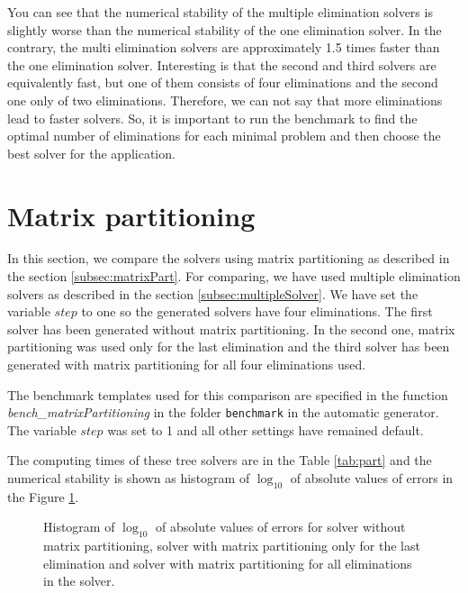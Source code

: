 You can see that the numerical stability of the multiple elimination solvers is slightly worse than the numerical stability of the one elimination solver. In the contrary, the multi elimination solvers are approximately 1.5 times faster than the one elimination solver. Interesting is that the second and third solvers are equivalently fast, but one of them consists of four eliminations and the second one only of two eliminations. Therefore, we can not say that more eliminations lead to faster solvers. So, it is important to run the benchmark to find the optimal number of eliminations for each minimal problem and then choose the best solver for the application.

\section{Matrix partitioning}
\label{exp:part}
In this section, we compare the solvers using matrix partitioning as described in the section \ref{subsec:matrixPart}. For comparing, we have used multiple elimination solvers as described in the section \ref{subsec:multipleSolver}. We have set the variable $step$ to one so the generated solvers have four eliminations. The first solver has been generated without matrix partitioning. In the second one, matrix partitioning was used only for the last elimination and the third solver has been generated with matrix partitioning for all four eliminations used.

The benchmark templates used for this comparison are specified in the function \textit{bench\_\-mat\-rix\-Partitioning} in the folder \texttt{benchmark} in the automatic generator. The variable $step$ was set to 1 and all other settings have remained default.

The computing times of these tree solvers are in the Table \ref{tab:part} and the numerical stability is shown as histogram of $\log_{10}$ of absolute values of errors in the Figure \ref{graph:part}.

\begin{figure}[ht]
  \centering
  \resizebox{0.95\textwidth}{!}{}
  \caption{Histogram of $\log_{10}$ of absolute values of errors for solver without matrix partitioning, solver with matrix partitioning only for the last elimination and solver with matrix partitioning for all eliminations in the solver.}
  \label{graph:part}
\end{figure}

